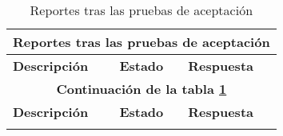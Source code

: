 \begin{longtable}[c]{|p{60mm}|p{20mm}|p{50mm}|}
	\caption{Reportes tras las pruebas de aceptación\label{table:reportes_aceptacion}}\\
		\hline
		\multicolumn{3}{|c|}{\textbf{Reportes tras las pruebas de aceptación}}\\
		\hline
		\textbf{Descripción} & \textbf{Estado} & \textbf{Respuesta}\\
		\hline
		\hline
	\endfirsthead

		\hline
		\multicolumn{3}{|c|}{\textbf{Continuación de la tabla \ref{table:reportes_aceptacion}}}\\
		\hline
		\textbf{Descripción} & \textbf{Estado} & \textbf{Respuesta}\\
		\hline
		\hline
	\endhead

	\hline
	\endfoot


\end{longtable}
